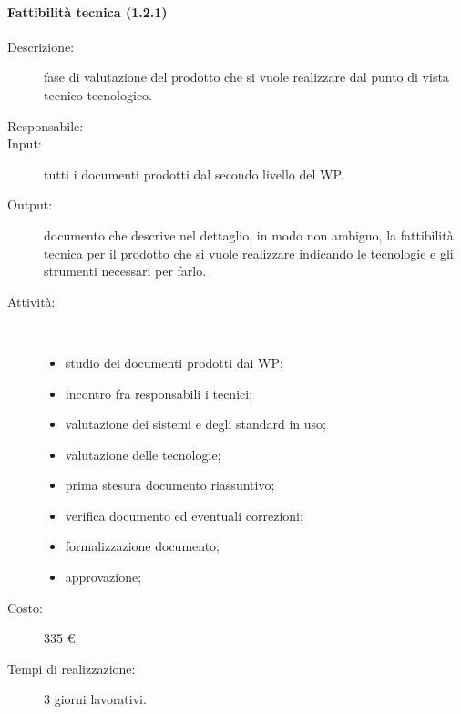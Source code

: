 \begin{description}
\paragraph{Fattibilit\`{a} tecnica (1.2.1)}
\begin{description}
\item[Descrizione:] fase di valutazione del prodotto che si vuole realizzare dal punto di vista tecnico-tecnologico.
\item[Responsabile:] 
\item[Input:] tutti i documenti prodotti dal secondo livello del WP.
\item[Output:] documento che descrive nel dettaglio, in modo non ambiguo, la fattibilità tecnica per il prodotto che si vuole realizzare indicando le tecnologie e gli strumenti necessari per farlo.
\item[Attività:]\mbox{}\\[-1.5\baselineskip]
	\begin{itemize}
	\item studio dei documenti prodotti dai WP;
	\item incontro fra responsabili i tecnici;
	\item valutazione dei sistemi e degli standard in uso;
	\item valutazione delle tecnologie;
	\item prima stesura documento riassuntivo;
	\item verifica documento ed eventuali correzioni;
	\item formalizzazione documento;
	\item approvazione;
	\end{itemize}
\item[Costo:] 335 \euro{}
\item[Tempi di realizzazione:] 3 giorni lavorativi.
\end{description}


\end{description}
